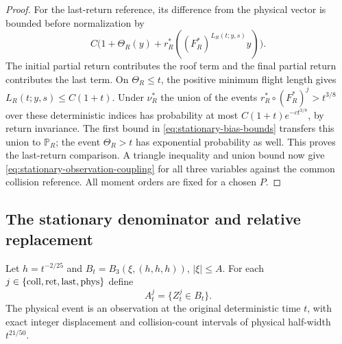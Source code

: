 \begin{proof}
For the last-return reference, its difference from the physical vector
is bounded before normalization by
\[
 C\bigl(1+\Theta_R(y)+r_R^*((F_R^*)^{L_R(t;y,s)}y)\bigr).
\]
The initial partial return contributes the roof term and the final
partial return contributes the last term. On $\Theta_R\le t$,
the positive minimum flight length gives $L_R(t;y,s)\le C(1+t)$.
Under $\nu_R^*$ the union of the events
$r_R^*\circ(F_R^*)^j>t^{3/8}$ over these deterministic indices has
probability at most $C(1+t)e^{-ct^{3/8}}$, by return invariance.
The first bound in \eqref{eq:stationary-bias-bounds} transfers this
union to $\mathbb P_R$; the event $\Theta_R>t$ has exponential
probability as well. This proves the last-return comparison.
A triangle inequality and union bound now give
\eqref{eq:stationary-observation-coupling} for all three variables
against the common collision reference. All moment orders are fixed
for a chosen $P$.
\end{proof}

\subsection{The stationary denominator and relative replacement}
Let $h=t^{-2/25}$ and $B_t=B_3(\xi,(h,h,h))$, $|\xi|\le A$.
For each $j\in\{{\rm coll},{\rm ret},{\rm last},{\rm phys}\}$ define
\begin{equation}\label{eq:stationary-four-events}
 A_t^j=\{Z_t^j\in B_t\}.
\end{equation}
The physical event is an observation at the original deterministic
time $t$, with exact integer displacement and collision-count
intervals of physical half-width $t^{21/50}$.

